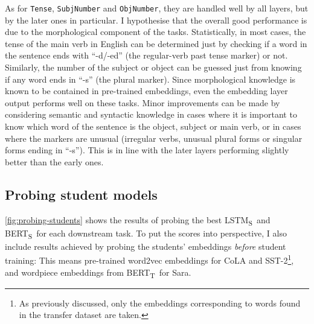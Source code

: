 \documentclass[bsc,frontabs,twoside,singlespacing,parskip,deptreport]{infthesis}
\def\BERTT{BERT\textsubscript{T}}
\def\BERTS{BERT\textsubscript{S}}
\def\LSTMS{LSTM\textsubscript{S}}
\begin{document}
{{{      As for \verb|Tense|, \verb|SubjNumber| and \verb|ObjNumber|, they are handled well by all layers, but by the later ones in particular. I hypothesise that the overall good performance is due to the morphological component of the tasks. Statistically, in most cases, the tense of the main verb in English can be determined just by checking if a word in the sentence ends with ``-d/-ed'' (the regular-verb past tense marker) or not. Similarly, the number of the subject or object can be guessed just from knowing if any word ends in ``-s'' (the plural marker). Since morphological knowledge is known to be contained in pre-trained embeddings, even the embedding layer output performs well on these tasks. Minor improvements can be made by considering semantic and syntactic knowledge in cases where it is important to know which word of the sentence is the object, subject or main verb, or in cases where the markers are unusual (irregular verbs, unusual plural forms or singular forms ending in ``-s''). This is in line with the later layers performing slightly better than the early ones.
    }

    \subsection{Probing student models}{
      \autoref{fig:probing-students} shows the results of probing the best \LSTMS~and \BERTS~for each downstream task. To put the scores into perspective, I also include results achieved by probing the students' embeddings \textit{before} student training: This means pre-trained word2vec embeddings for CoLA and SST-2\footnote{As previously discussed, only the embeddings corresponding to words found in the transfer dataset are taken.}, and wordpiece embeddings from \BERTT~for Sara.
      
}}}
\end{document}
